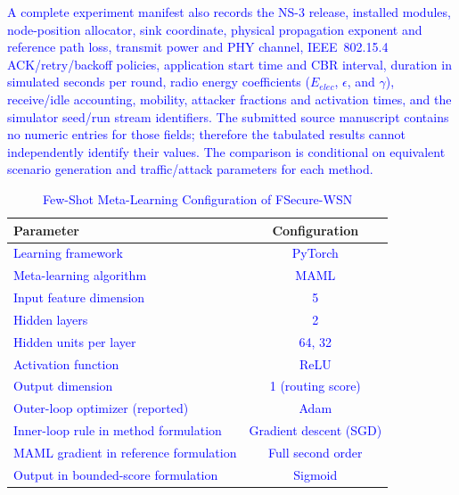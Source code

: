 \documentclass[pdflatex,sn-mathphys-num]{sn-jnl}
\newcommand{\Revised}[1]{\textcolor{blue}{#1}}
\begin{document}
\Revised{A complete experiment manifest also records the NS-3 release, installed modules, node-position allocator, sink coordinate, physical propagation exponent and reference path loss, transmit power and PHY channel, IEEE~802.15.4 ACK/retry/backoff policies, application start time and CBR interval, duration in simulated seconds per round, radio energy coefficients ($E_{elec}$, $\epsilon$, and $\gamma$), receive/idle accounting, mobility, attacker fractions and activation times, and the simulator seed/run stream identifiers. The submitted source manuscript contains no numeric entries for those fields; therefore the tabulated results cannot independently identify their values. The comparison is conditional on equivalent scenario generation and traffic/attack parameters for each method.}

\begin{table}[ht]
\centering
\caption{\textcolor{blue}{Few-Shot Meta-Learning Configuration of FSecure-WSN}}
\label{tab:learningparams}
\begin{tabular}{|l|c|}
\hline
\textbf{Parameter} & \textbf{Configuration} \\
\hline
\textcolor{blue}{Learning framework} 
& \textcolor{blue}{PyTorch} \\

\textcolor{blue}{Meta-learning algorithm} 
& \textcolor{blue}{MAML} \\

\textcolor{blue}{Input feature dimension} 
& \textcolor{blue}{5} \\

\textcolor{blue}{Hidden layers} 
& \textcolor{blue}{2} \\

\textcolor{blue}{Hidden units per layer} 
& \textcolor{blue}{64, 32} \\

\textcolor{blue}{Activation function} 
& \textcolor{blue}{ReLU} \\

\textcolor{blue}{Output dimension} 
& \textcolor{blue}{1 (routing score)} \\

\textcolor{blue}{Outer-loop optimizer (reported)} 
& \textcolor{blue}{Adam} \\
\textcolor{blue}{Inner-loop rule in method formulation} & \textcolor{blue}{Gradient descent (SGD)} \\
\textcolor{blue}{MAML gradient in reference formulation} & \textcolor{blue}{Full second order} \\
\textcolor{blue}{Output in bounded-score formulation} & \textcolor{blue}{Sigmoid} \\


\end{tabular}
\end{table}
\end{document}
